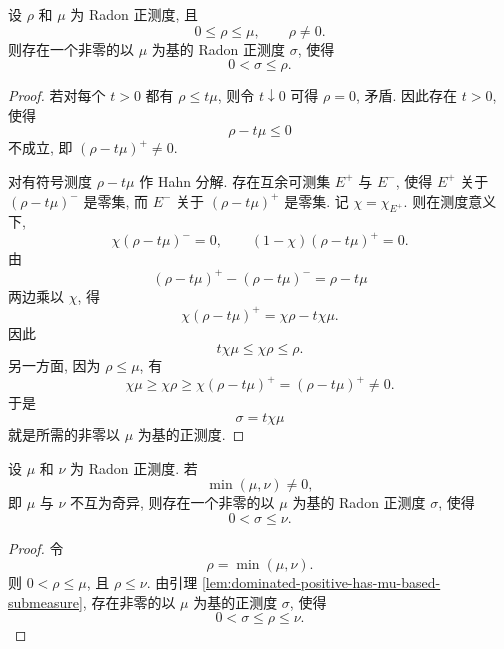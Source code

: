 \begin{lem}\label{lem:dominated-positive-has-mu-based-submeasure}
	设 \(\rho\) 和 \(\mu\) 为 Radon 正测度, 且
	\[
	0\leq \rho\leq \mu,
	\qquad \rho\neq0.
	\]
	则存在一个非零的以 \(\mu\) 为基的 Radon 正测度 \(\sigma\), 使得
	\[
	0<\sigma\leq\rho.
	\]
\end{lem}

\begin{proof}
	若对每个 \(t>0\) 都有 \(\rho\leq t\mu\), 则令 \(t\downarrow0\) 可得 \(\rho=0\), 矛盾. 因此存在 \(t>0\), 使得
	\[
	\rho-t\mu\leq0
	\]
	不成立, 即 \((\rho-t\mu)^+\neq0\).
	
	对有符号测度 \(\rho-t\mu\) 作 Hahn 分解. 存在互余可测集 \(E^+\) 与 \(E^-\), 使得 \(E^+\) 关于 \((\rho-t\mu)^-\) 是零集, 而 \(E^-\) 关于 \((\rho-t\mu)^+\) 是零集. 记 \(\chi=\chi_{E^+}\). 则在测度意义下,
	\[
	\chi(\rho-t\mu)^-=0,
	\qquad
	(1-\chi)(\rho-t\mu)^+=0.
	\]
	由
	\[
	(\rho-t\mu)^+-(\rho-t\mu)^-=\rho-t\mu
	\]
	两边乘以 \(\chi\), 得
	\[
	\chi(\rho-t\mu)^+=\chi\rho-t\chi\mu.
	\]
	因此
	\[
	t\chi\mu\leq \chi\rho\leq \rho.
	\]
	另一方面, 因为 \(\rho\leq\mu\), 有
	\[
	\chi\mu\geq\chi\rho\geq\chi(\rho-t\mu)^+=(\rho-t\mu)^+\neq0.
	\]
	于是
	\[
	\sigma=t\chi\mu
	\]
	就是所需的非零以 \(\mu\) 为基的正测度.
\end{proof}

\begin{lem}\label{lem:non-singular-gives-mu-based-submeasure}
	设 \(\mu\) 和 \(\nu\) 为 Radon 正测度. 若
	\[
	\min(\mu,\nu)\neq0,
	\]
	即 \(\mu\) 与 \(\nu\) 不互为奇异, 则存在一个非零的以 \(\mu\) 为基的 Radon 正测度 \(\sigma\), 使得
	\[
	0<\sigma\leq\nu.
	\]
\end{lem}

\begin{proof}
	令
	\[
	\rho=\min(\mu,\nu).
	\]
	则 \(0<\rho\leq\mu\), 且 \(\rho\leq\nu\). 由引理 \ref{lem:dominated-positive-has-mu-based-submeasure}, 存在非零的以 \(\mu\) 为基的正测度 \(\sigma\), 使得
	\[
	0<\sigma\leq\rho\leq\nu.
	\]
\end{proof}

